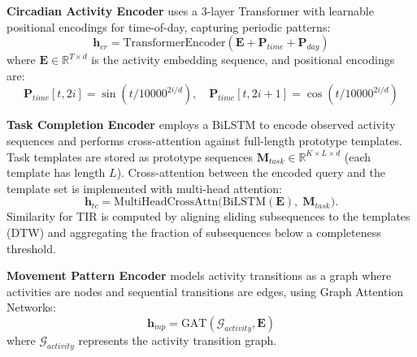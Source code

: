 \documentclass[sigconf, anonymous, 9pt, nonacm]{acmart}
\begin{document}
\noindent\textbf{Circadian Activity Encoder} uses a 3-layer Transformer with learnable positional encodings for time-of-day, capturing periodic patterns:
\begin{equation*}
\mathbf{h}_{cr} = \text{TransformerEncoder}(\mathbf{E} + \mathbf{P}_{time} + \mathbf{P}_{day})
\end{equation*}
where $\mathbf{E} \in \mathbb{R}^{T \times d}$ is the activity embedding sequence, and positional encodings are:
\begin{equation*}
\mathbf{P}_{time}[t, 2i] = \sin(t/10000^{2i/d}), \quad \mathbf{P}_{time}[t, 2i+1] = \cos(t/10000^{2i/d})
\end{equation*}

\noindent\textbf{Task Completion Encoder} employs a BiLSTM to encode observed activity sequences and performs cross-attention against full-length prototype templates. Task templates are stored as prototype sequences
\(\mathbf{M}_{task} \in \mathbb{R}^{K\times L\times d}\) (each template has length $L$). Cross-attention between the encoded query and the template set is implemented with multi-head attention:
\begin{equation*}
\mathbf{h}_{tc} = \text{MultiHeadCrossAttn}\big(\text{BiLSTM}(\mathbf{E}),\;\mathbf{M}_{task}\big).
\end{equation*}
Similarity for TIR is computed by aligning sliding subsequences to the templates (DTW) and aggregating the fraction of subsequences below a completeness threshold.

\noindent\textbf{Movement Pattern Encoder} models activity transitions as a graph where activities are nodes and sequential transitions are edges, using Graph Attention Networks:
\begin{equation*}
\mathbf{h}_{mp} = \text{GAT}(\mathcal{G}_{activity}, \mathbf{E})
\end{equation*}
where $\mathcal{G}_{activity}$ represents the activity transition graph.
\end{document}
